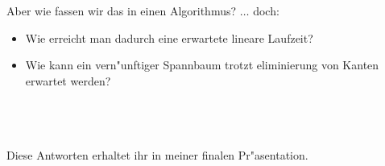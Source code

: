 \documentclass[10pt]{beamer}
\newcommand{\gap}{\ \\ \ \\}
\begin{document}
\begin{frame}{Aber wie fassen wir das in einen Algorithmus?}
    $\ldots$ doch:\\
    \begin{itemize}
        \item Wie erreicht man dadurch eine erwartete lineare Laufzeit?
        \item Wie kann ein vern"unftiger Spannbaum trotzt eliminierung von Kanten
              erwartet werden?
    \end{itemize}\\
    \gap
    Diese Antworten erhaltet ihr in meiner finalen Pr"asentation.
\end{frame}
\end{document}
